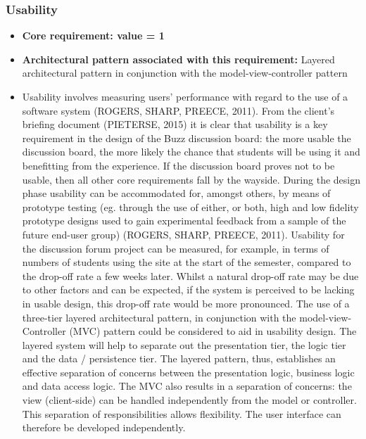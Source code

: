 \documentclass[a4paper]{article}
\begin{document}
\subsubsection{Usability}
\begin{itemize}
	\item \textbf{Core requirement: value = 1}
	\item \textbf{Architectural pattern associated with this requirement:} Layered architectural pattern in conjunction with the model-view-controller pattern 
	\item Usability involves measuring users’ performance with regard to the use of a software system (ROGERS, SHARP, PREECE, 2011). From the client’s briefing document (PIETERSE, 2015) it is clear that usability is a key requirement in the design of the Buzz discussion board: the more usable the discussion board, the more likely the chance that students will be using it and benefitting from the experience. If the discussion board proves not to be usable, then all other core requirements fall by the wayside. During the design phase usability can be accommodated for, amongst others, by means of prototype testing (eg. through the use of either, or both, high and low fidelity prototype designs used to gain experimental feedback from a sample of the future end-user group) (ROGERS, SHARP, PREECE, 2011). Usability for the discussion forum project can be measured, for example, in terms of numbers of students using the site at the start of the semester, compared to the drop-off rate a few weeks later. Whilst a natural drop-off rate may be due to other factors and can be expected, if the system is perceived to be lacking in usable design, this drop-off rate would be more pronounced. The use of a three-tier layered architectural pattern, in conjunction with the model-view-Controller (MVC) pattern could be considered to aid in usability design. The layered system will help to separate out the presentation tier, the logic tier and the data / persistence tier. The layered pattern, thus, establishes an effective separation of concerns between the presentation logic, business logic and data access logic. The MVC also results in a separation of concerns: the view (client-side) can be handled independently from the model or controller. This separation of responsibilities allows flexibility. The user interface can therefore be developed independently. 
\end{itemize}
\end{document}
